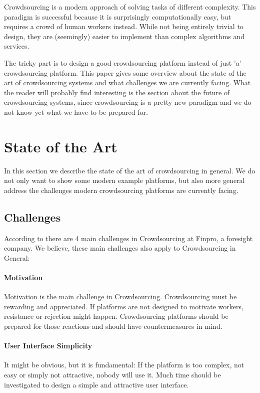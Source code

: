 \documentclass{sig-alternate}
\begin{document}
Crowdsourcing is a modern approach of solving tasks of different complexity. This paradigm is successful because it is surprisingly computationally easy, but requires a crowd 
of human workers instead. While not being entirely trivial to design, they are (seemingly) easier to implement than complex algorithms and services.

The tricky part is to design a good crowdsourcing platform instead of just 'a' crowdsourcing platform. 
This paper gives some overview about the state of the art of crowdsourcing systems and what challenges we are currently facing. 
What the reader will probably find interesting is the section about the future of crowdsourcing systems, since crowdsourcing is a pretty new paradigm and we do not know yet what 
we have to be prepared for.

\section{State of the Art}

In this section we describe the state of the art of crowdsourcing in general. We do not only want to show some modern example platforms, but also more general address
the challenges modern crowdsourcing platforms are currently facing.

\subsection{Challenges}

According to \cite{r02} there are 4 main challenges in Crowdsourcing at Finpro, a foresight company. We believe, these
main challenges also apply to Crowdsourcing in General:

\paragraph{Motivation}
Motivation is the main challenge in Crowdsourcing. Crowdsourcing must be rewarding and appreciated. If platforms
are not designed to motivate workers, resistance or rejection might happen. Crowdsourcing platforms should be prepared
for those reactions and should have countermeasures in mind.

\paragraph{User Interface Simplicity}
It might be obvious, but it is fundamental: If the platform is too complex, not easy or simply not attractive, nobody will use it.
Much time should be investigated to design a simple and attractive user interface.
\end{document}
